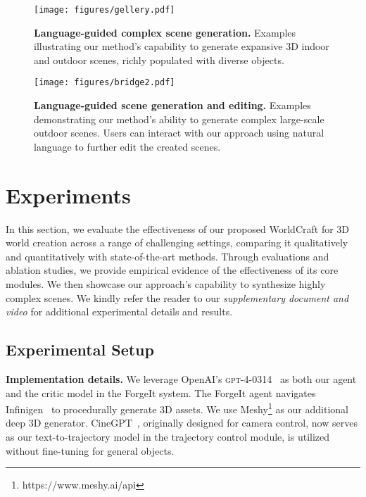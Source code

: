 \begin{figure*}[t]
\begin{center}
    \texttt{[image: figures/gellery.pdf]}
\end{center}
\caption{\textbf{Language-guided complex scene generation.} Examples illustrating our method’s capability to generate expansive 3D indoor and outdoor scenes, richly populated with diverse objects.}
\label{fig:gallery_1}
\end{figure*}

\begin{figure*}[t]
\begin{center}
    \texttt{[image: figures/bridge2.pdf]}
\end{center}
\caption{\textbf{Language-guided scene generation and editing.}  Examples demonstrating our method's ability to generate complex large-scale outdoor scenes. Users can interact with our approach using natural language to further edit the created scenes.}
\label{fig:gallery_2}
\end{figure*}


\section{Experiments}
In this section, we evaluate the effectiveness of our proposed WorldCraft for 3D world creation across a range of challenging settings, comparing it qualitatively and quantitatively with state-of-the-art methods. Through evaluations and ablation studies, we provide empirical evidence of the effectiveness of its core modules. We then showcase our approach's capability to synthesize highly complex scenes.
We kindly refer the reader to our \emph{supplementary document and video} for additional experimental details and results.

\subsection{Experimental Setup}
\noindent\textbf{Implementation details.} We leverage OpenAI’s \textsc{gpt-4-0314}~\cite{achiam2023gpt} as both our agent and the critic model in the ForgeIt system. The ForgeIt agent navigates Infinigen~\cite{infinigen2023infinite,infinigen2024indoors} to procedurally generate 3D assets. We use Meshy\footnote{https://www.meshy.ai/api} as our additional deep 3D generator. CineGPT~\cite{liu2024chatcam}, originally designed for camera control, now serves as our text-to-trajectory model in the trajectory control module, is utilized without fine-tuning for general objects.

